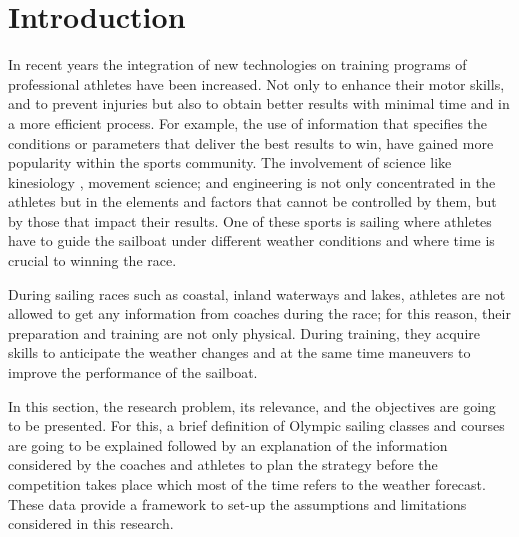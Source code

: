 \chapter{Introduction}


In recent years the integration of new technologies on training programs of professional athletes have been increased. Not only to enhance their motor skills, and to prevent injuries but also to obtain better results with minimal time and in a more efficient process. For example, the use of information that specifies the conditions or parameters that deliver the best results to win, have gained more popularity within the sports community. The involvement of science like kinesiology \cite{sjogaard2015science}, movement science; and engineering is not only concentrated in the athletes but in the elements and factors that cannot be controlled by them, but by those that impact their results. One of these sports is sailing where athletes have to guide the sailboat under different weather conditions and where time is crucial to winning the race.\par
During sailing races such as coastal, inland waterways and lakes, athletes are not allowed to get any information from coaches during the race; for this reason, their preparation and training are not only physical. During training, they acquire skills to anticipate the weather changes and at the same time maneuvers to improve the performance of the sailboat. \par
In this section, the research problem, its relevance, and the objectives are going to be presented. For this, a brief definition of Olympic sailing classes and courses are going to be explained followed by an explanation of the information considered by the coaches and athletes to plan the strategy before the competition takes place which most of the time refers to the weather forecast. These data provide a framework to set-up the assumptions and limitations considered in this research. \par 
